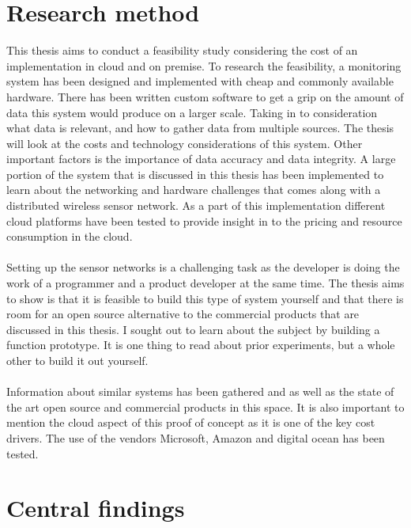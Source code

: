 \documentclass[]{uiophd}
\begin{document}
\section{Research method}
 This thesis aims to conduct a feasibility study considering the cost of an implementation in cloud and on premise. To research the feasibility, a monitoring system has been designed and implemented with cheap and commonly available hardware. There has been written custom software to get a grip on the amount of data this system would produce on a larger scale. Taking in to consideration what data is relevant, and how to gather data from multiple sources. The thesis will look at the costs and technology considerations of this system. Other important factors is the importance of data accuracy and data integrity. A large portion of the system that is discussed in this thesis has been implemented to learn about the networking and hardware challenges that comes along with a distributed wireless sensor network. As a part of this implementation different cloud platforms have been tested to provide insight in to the pricing and resource consumption in the cloud. 
\\\\
Setting up the sensor networks is a challenging task as the developer is doing the work of a programmer and a product developer at the same time. The thesis aims to show is that it is feasible to build this type of system yourself and that there is room for an open source alternative to the commercial products that are discussed in this thesis. I sought out to learn about the subject by building a function prototype. It is one thing to read about prior experiments, but a whole other to build it out yourself.
\\\\
Information about similar systems has been gathered and as well as the state of the art open source and commercial products in this space. It is also important to mention the cloud aspect of this proof of concept as it is one of the key cost drivers. The use of the vendors Microsoft, Amazon and digital ocean has been tested.

\section{Central findings}
\end{document}
